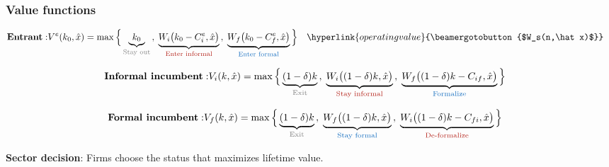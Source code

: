 \documentclass[aspectratio=169]{beamer}
\begin{document}

\begin{frame}\label{value_functions}
\frametitle{Value functions} \label{valuefunctions}

\begin{align*}
    \text{\textbf{Entrant}}: & V^{e}(k_0,\hat{x}) = \max\Big\{ \underbrace{k_0}_{\text{\textcolor{gray}{Stay out}}} \,,\; \underbrace{W_i\big(k_0 - C^{e}_{i},\hat{x}\big)}_{\text{\textcolor{BrickRed}{Enter informal}}} \,,\; \underbrace{W_f\big(k_0 - C^{e}_{f},\hat{x}\big)}_{\text{\textcolor{RoyalBlue}{Enter formal}}} \Big\} \quad \hyperlink{operatingvalue}{\beamergotobutton{$W_s(n,\hat x)$}}
\end{align*}
\pause

\begin{align*}
    \text{\textbf{Informal incumbent}}: & V_i(k,\hat{x}) = \max\Big\{ \underbrace{(1-\delta)k}_{\text{\textcolor{gray}{Exit}}} \,,\; \underbrace{W_i\big((1-\delta)k,\hat{x}\big)}_{\text{\textcolor{BrickRed}{Stay informal}}} \,,\; \underbrace{W_f\big((1-\delta)k - C_{if},\hat{x}\big)}_{\text{\textcolor{RoyalBlue}{Formalize}}} \Big\}
\end{align*}
\pause

\begin{align*}
    \text{\textbf{Formal incumbent}}: & V_f(k,\hat{x}) = \max\Big\{ \underbrace{(1-\delta)k}_{\text{\textcolor{gray}{Exit}}} \,,\; \underbrace{W_f\big((1-\delta)k,\hat{x}\big)}_{\text{\textcolor{RoyalBlue}{Stay formal}}} \,,\; \underbrace{W_i\big((1-\delta)k - C_{fi},\hat{x}\big)}_{\text{\textcolor{BrickRed}{De-formalize}}} \Big\}
\end{align*}
\pause

\vspace{3mm}

\begin{center}
    \large \textbf{Sector decision}: Firms choose the status that maximizes lifetime value.
\end{center}


\end{frame}

\end{document}
